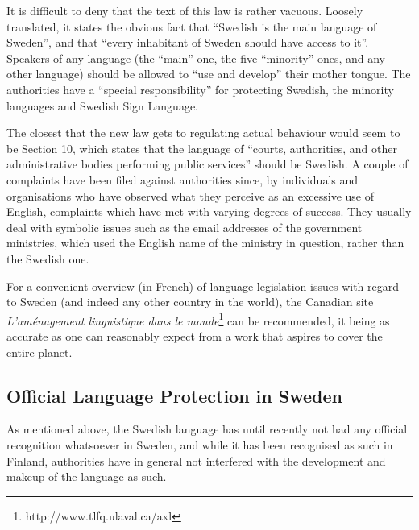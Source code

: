 \begin{multicols}{2}
It is difficult to deny that the text of this law is rather
vacuous. Loosely translated, it states the obvious fact that ``Swedish
is the main language of Sweden'', and that ``every inhabitant of Sweden
should have access to it''. Speakers of any language (the ``main'' one,
the five ``minority'' ones, and any other language) should be allowed to
``use and develop'' their mother tongue. The authorities have a ``special
responsibility'' for protecting Swedish, the minority languages and
Swedish Sign Language.

The closest that the new law gets to regulating actual behaviour would
seem to be Section 10, which states that the language of ``courts,
authorities, and other administrative bodies performing public
services'' should be Swedish. A couple of complaints have been filed
against authorities since, by individuals and organisations who have
observed what they perceive as an excessive use of English, complaints
which have met with varying degrees of success. They usually deal with
symbolic issues such as the email addresses of the government
ministries, which used the English name of the ministry in question,
rather than the Swedish one.

For a convenient overview (in French) of language legislation issues
with regard to Sweden (and indeed any other country in the world), the
Canadian site \textit{L'aménagement linguistique dans le
  monde}\footnote{http://www.tlfq.ulaval.ca/axl} can be recommended,
it being as accurate as one can reasonably expect from a work that
aspires to cover the entire planet.

\subsection{Official Language Protection in Sweden}

As mentioned above, the Swedish language has until recently not had
any official recognition whatsoever in Sweden, and while it has been
recognised as such in Finland, authorities have in general not
interfered with the development and makeup of the language as such.



\end{multicols}
